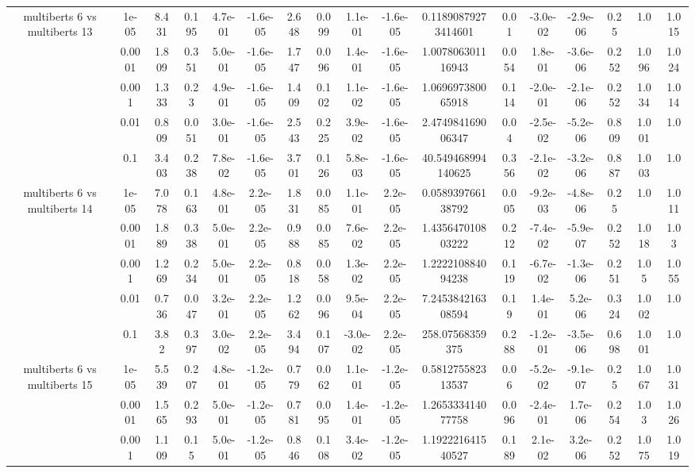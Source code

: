 \begin{tabular}{|c|c|c|c|c|c|c|c|c|c|c|c|c|c|c|c|c|}
\hline
\multirow{5}{*}{multiberts 6 vs multiberts 13} & 1e-05 & 8.431 & 0.195 & 4.7e-01 & -1.6e-05 & 2.648 & 0.099 & 1.1e-01 & -1.6e-05 & 0.11890879273414601 & 0.01 & -3.0e-02 & -2.9e-06 & 0.25 & 1.0 & 1.015 \\
 & 0.0001 & 1.809 & 0.351 & 5.0e-01 & -1.6e-05 & 1.747 & 0.096 & 1.4e-01 & -1.6e-05 & 1.007806301116943 & 0.054 & 1.8e-01 & -3.6e-06 & 0.252 & 1.096 & 1.024 \\
 & 0.001 & 1.333 & 0.23 & 4.9e-01 & -1.6e-05 & 1.409 & 0.102 & 1.1e-02 & -1.6e-05 & 1.069697380065918 & 0.114 & -2.0e-01 & -2.1e-06 & 0.252 & 1.034 & 1.014 \\
 & 0.01 & 0.809 & 0.051 & 3.0e-01 & -1.6e-05 & 2.543 & 0.225 & 3.9e-02 & -1.6e-05 & 2.474984169006347 & 0.04 & -2.5e-02 & -5.2e-06 & 0.809 & 1.001 & 1.0 \\
 & 0.1 & 3.403 & 0.238 & 7.8e-02 & -1.6e-05 & 3.701 & 0.126 & 5.8e-03 & -1.6e-05 & 40.549468994140625 & 0.356 & -2.1e-02 & -3.2e-06 & 0.887 & 1.003 & 1.0 \\
\hline
\multirow{5}{*}{multiberts 6 vs multiberts 14} & 1e-05 & 7.078 & 0.163 & 4.8e-01 & 2.2e-05 & 1.831 & 0.085 & 1.1e-01 & 2.2e-05 & 0.058939766138792 & 0.005 & -9.2e-03 & -4.8e-06 & 0.25 & 1.0 & 1.011 \\
 & 0.0001 & 1.889 & 0.338 & 5.0e-01 & 2.2e-05 & 0.988 & 0.085 & 7.6e-02 & 2.2e-05 & 1.435647010803222 & 0.212 & -7.4e-02 & -5.9e-07 & 0.252 & 1.018 & 1.03 \\
 & 0.001 & 1.269 & 0.234 & 5.0e-01 & 2.2e-05 & 0.818 & 0.058 & 1.3e-02 & 2.2e-05 & 1.222210884094238 & 0.119 & -6.7e-02 & -1.3e-06 & 0.251 & 1.05 & 1.055 \\
 & 0.01 & 0.736 & 0.047 & 3.2e-01 & 2.2e-05 & 1.262 & 0.096 & 9.5e-04 & 2.2e-05 & 7.245384216308594 & 0.19 & 1.4e-01 & 5.2e-06 & 0.324 & 1.002 & 1.0 \\
 & 0.1 & 3.82 & 0.397 & 3.0e-02 & 2.2e-05 & 3.494 & 0.107 & -3.0e-02 & 2.2e-05 & 258.07568359375 & 0.288 & -1.2e-01 & -3.5e-06 & 0.698 & 1.001 & 1.0 \\
\hline
\multirow{5}{*}{multiberts 6 vs multiberts 15} & 1e-05 & 5.539 & 0.207 & 4.8e-01 & -1.2e-05 & 0.779 & 0.062 & 1.1e-01 & -1.2e-05 & 0.581275582313537 & 0.06 & -5.2e-02 & -9.1e-07 & 0.25 & 1.067 & 1.031 \\
 & 0.0001 & 1.565 & 0.293 & 5.0e-01 & -1.2e-05 & 0.781 & 0.095 & 1.4e-01 & -1.2e-05 & 1.265333414077758 & 0.096 & -2.4e-01 & 1.7e-06 & 0.254 & 1.03 & 1.026 \\
 & 0.001 & 1.109 & 0.15 & 5.0e-01 & -1.2e-05 & 0.846 & 0.108 & 3.4e-02 & -1.2e-05 & 1.192221641540527 & 0.189 & 2.1e-02 & 3.2e-06 & 0.252 & 1.075 & 1.019 \\

\end{tabular}
